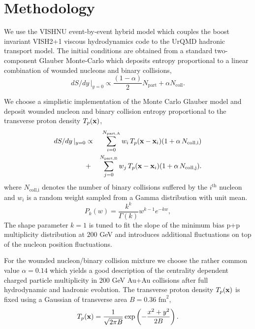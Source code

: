 \documentclass[aps,prc,reprint,amsmath,nofootinbib,superscriptaddress]{revtex4-1}
\begin{document}
\section{Methodology}

We use the {\ttfamily VISHNU} event-by-event hybrid model which couples the boost invariant {\ttfamily VISH2+1} viscous hydrodynamics code to the {\ttfamily UrQMD} hadronic transport model. The initial conditions are obtained
from a standard two-component Glauber Monte-Carlo which deposits entropy proportional to a linear combination of wounded nucleons and binary collisions,
\begin{equation}
 dS/dy \,\vert_{y=0} \propto \frac{(1-\alpha)}{2}N_\text{part} + \alpha N_\text{coll}.
\end{equation}

We choose a simplistic implementation of the Monte Carlo Glauber model and deposit wounded nucleon and binary collision entropy proportional to the transverse proton density $T_p({\bf x})$,
\begin{eqnarray}
 dS/dy \,\vert_{y=0} &\propto& \sum\limits_{i=0}^{N_\text{part,A}} w_i\, T_p({\bf x} - {\bf x}_i)(1+\alpha\, N_\text{coll,i}) \nonumber \\
                     &+& \sum\limits_{j=0}^{N_\text{part,B}} w_j\, T_p({\bf x} - {\bf x}_i)(1+\alpha\, N_\text{coll,j}).
\end{eqnarray}
where $N_\text{coll,i}$ denotes the number of binary collisions suffered by the $i^\text{th}$ nucleon and $w_i$ is a random weight sampled from a Gamma distribution with unit mean.
\begin{equation}
 P_k(w) = \frac{k^k}{\Gamma(k)} w^{k-1} e^{-k w},
\end{equation}
The shape parameter $k=1$ is tuned to fit the slope of the minimum bias p+p multiplicity distribution at $200$ GeV and introduces additional fluctuations on top of the nucleon position fluctuations.

For the wounded nucleon/binary collision mixture we choose the rather common value $\alpha=0.14$ which yields a good description of the centrality dependent charged particle multiplicity 
in $200$ GeV Au+Au collisions after full hydrodynamic and hadronic evolution. The transverse proton density $T_p({\bf x})$ is fixed using a Gaussian of transverse area $B = 0.36$ $\text{fm}^2$,
\begin{equation}
 T_p({\bf x}) = \frac{1}{\sqrt{2 \pi B}} \exp \left(-\frac{x^2+y^2}{2 B} \right).
\end{equation}
 
\end{document}

